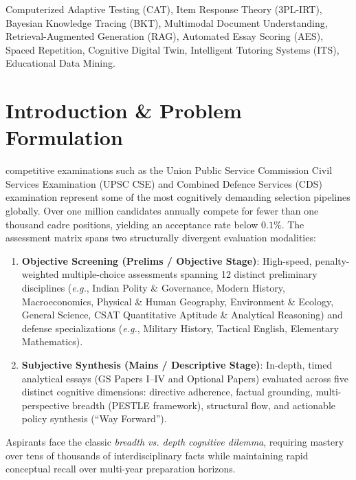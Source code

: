 \documentclass[conference]{IEEEtran}
\begin{document}
\begin{IEEEkeywords}
Computerized Adaptive Testing (CAT), Item Response Theory (3PL-IRT), Bayesian Knowledge Tracing (BKT), Multimodal Document Understanding, Retrieval-Augmented Generation (RAG), Automated Essay Scoring (AES), Spaced Repetition, Cognitive Digital Twin, Intelligent Tutoring Systems (ITS), Educational Data Mining.
\end{IEEEkeywords}

\section{Introduction \& Problem Formulation}
 competitive examinations such as the Union Public Service Commission Civil Services Examination (UPSC CSE) and Combined Defence Services (CDS) examination represent some of the most cognitively demanding selection pipelines globally. Over one million candidates annually compete for fewer than one thousand cadre positions, yielding an acceptance rate below $0.1\%$. The assessment matrix spans two structurally divergent evaluation modalities:
\begin{enumerate}[leftmargin=*]
    \item \textbf{Objective Screening (Prelims / Objective Stage)}: High-speed, penalty-weighted multiple-choice assessments spanning 12 distinct preliminary disciplines (\textit{e.g.}, Indian Polity \& Governance, Modern History, Macroeconomics, Physical \& Human Geography, Environment \& Ecology, General Science, CSAT Quantitative Aptitude \& Analytical Reasoning) and defense specializations (\textit{e.g.}, Military History, Tactical English, Elementary Mathematics).
    \item \textbf{Subjective Synthesis (Mains / Descriptive Stage)}: In-depth, timed analytical essays (GS Papers I--IV and Optional Papers) evaluated across five distinct cognitive dimensions: directive adherence, factual grounding, multi-perspective breadth (PESTLE framework), structural flow, and actionable policy synthesis (``Way Forward'').
\end{enumerate}

Aspirants face the classic \textit{breadth vs. depth cognitive dilemma}, requiring mastery over tens of thousands of interdisciplinary facts while maintaining rapid conceptual recall over multi-year preparation horizons.
\end{document}
